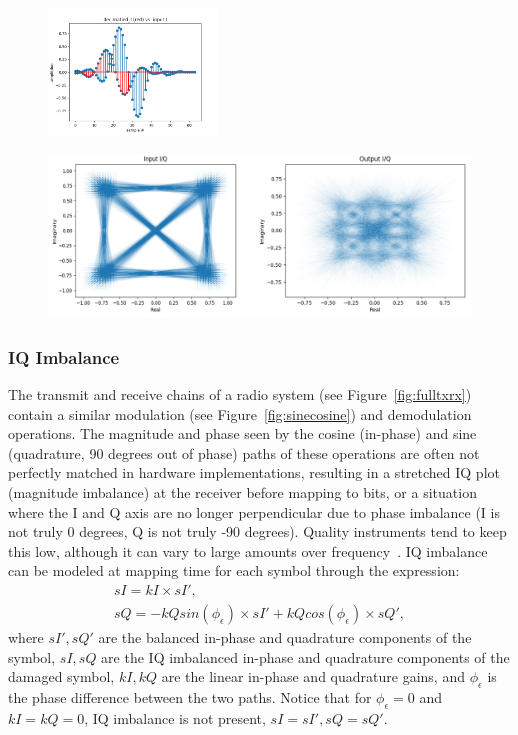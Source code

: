 \FloatBarrier
\begin{figure}[ht!]
	\centering	\includegraphics[width=0.4\textwidth,keepaspectratio]{figs/email_comparison.png}
    \caption{} 
\label{fig:stoin}      
\end{figure}
\FloatBarrier

\FloatBarrier
\begin{figure}[ht!]
	\centering	\includegraphics[width=1\textwidth,keepaspectratio]{figs/stoiq.png}
    \caption{} 
\label{fig:stoin}      
\end{figure}
\FloatBarrier

\subsubsection{IQ Imbalance}
\label{iq}
The transmit and receive chains of a radio system (see Figure~\ref{fig:fulltxrx}) contain a similar modulation (see Figure~\ref{fig:sinecosine}) and demodulation operations. The magnitude and phase seen by the cosine (in-phase) and sine (quadrature, 90 degrees out of phase) paths of these operations are often not perfectly matched in hardware implementations, resulting in a stretched IQ plot (magnitude imbalance) at the receiver before mapping to bits, or a situation where the I and Q axis are no longer perpendicular due to phase imbalance (I is not truly 0 degrees, Q is not truly -90 degrees). Quality instruments tend to keep this low, although it can vary to large amounts over frequency~\cite{n210sbx}. IQ imbalance can be modeled at mapping time for each symbol through the expression:
\begin{subequations}
\label{eq:iqimbal}
\begin{align}
sI = kI \times sI',
\\
sQ = -kQsin(\phi_{\epsilon}) \times sI' + kQcos(\phi_{\epsilon}) \times sQ',
\end{align}
\end{subequations}
where $sI', sQ'$ are the balanced in-phase and quadrature components of the symbol, $sI, sQ$ are the IQ imbalanced in-phase and quadrature components of the damaged symbol, $kI, kQ$ are the linear in-phase and quadrature gains, and $\phi_{\epsilon}$ is the phase difference between the two paths. Notice that for $\phi_{\epsilon} = 0$ and $kI=kQ=0$, IQ imbalance is not present, $sI=sI',sQ=sQ'$.

